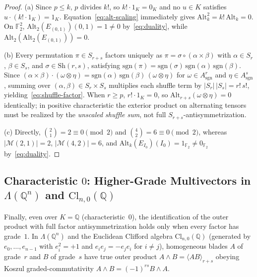 \documentclass[11pt,a4paper]{article}
\theoremstyle{definition}
\theoremstyle{remark}
\newcommand{\Alt}{\mathrm{Alt}}
\newcommand{\Cl}{\mathrm{Cl}}
\newcommand{\Sh}{\mathrm{Sh}}
\newcommand{\sgn}{\mathrm{sgn}}
\newcommand{\F}{\mathbb{F}}
\newcommand{\Q}{\mathbb{Q}}
\begin{document}
\begin{proof}
(a) Since $p \le k$, $p$ divides $k!$, so $k! \cdot 1_K = 0_K$ and no $u \in K$ satisfies $u \cdot (k! \cdot 1_K) = 1_K$. Equation~\eqref{eq:alt-scaling} immediately gives $\Alt_k^2 = k!\,\Alt_k = 0$. On $\F_2^2$, $\Alt_2(E_{(0,1)})(0,1) = 1 \neq 0$ by~\eqref{eq:duality}, while $\Alt_2(\Alt_2(E_{(0,1)})) = 0$.

(b) Every permutation $\pi \in S_{r+s}$ factors uniquely as $\pi = \sigma \circ (\alpha \times \beta)$ with $\alpha \in S_r$, $\beta \in S_s$, and $\sigma \in \Sh(r,s)$, satisfying $\sgn(\pi) = \sgn(\sigma)\,\sgn(\alpha)\,\sgn(\beta)$. Since $(\alpha \times \beta) \cdot (\omega \otimes \eta) = \sgn(\alpha)\,\sgn(\beta)\,(\omega \otimes \eta)$ for $\omega \in A^r_{\sgn}$ and $\eta \in A^s_{\sgn}$, summing over $(\alpha, \beta) \in S_r \times S_s$ multiplies each shuffle term by $|S_r|\,|S_s| = r!\,s!$, yielding~\eqref{eq:shuffle-factor}. When $r \ge p$, $r! \cdot 1_K = 0$, so $\Alt_{r+s}(\omega \otimes \eta) = 0$ identically; in positive characteristic the exterior product on alternating tensors must be realized by the \emph{unscaled shuffle sum}, not full $S_{r+s}$-antisymmetrization.

(c) Directly, $\binom{2}{1} = 2 \equiv 0 \pmod 2$ and $\binom{4}{2} = 6 \equiv 0 \pmod 2$, whereas $|\mathcal{M}(2,1)| = 2$, $|\mathcal{M}(4,2)| = 6$, and $\Alt_k(E_{I_0})(I_0) = 1_{\F_2} \neq 0_{\F_2}$ by~\eqref{eq:duality}.
\end{proof}

\subsection{Characteristic \texorpdfstring{$0$}{0}: Higher-Grade Multivectors in \texorpdfstring{$\Lambda(\Q^n)$}{Lambda(Q\^n)} and \texorpdfstring{$\Cl_{n,0}(\Q)$}{Cl\_\{n,0\}(Q)}}

Finally, even over $K = \Q$ (characteristic~$0$), the identification of the outer product with full factor antisymmetrization holds only when every factor has grade~$1$. In $\Lambda(\Q^n)$ and the Euclidean Clifford algebra $\Cl_{n,0}(\Q)$ (generated by $e_0, \dots, e_{n-1}$ with $e_i^2 = +1$ and $e_i e_j = -e_j e_i$ for $i \neq j$), homogeneous blades $A$ of grade~$r$ and $B$ of grade~$s$ have true outer product $A \wedge B = \langle A B \rangle_{r+s}$ obeying Koszul graded-commutativity $A \wedge B = (-1)^{rs} B \wedge A$.
\end{document}
